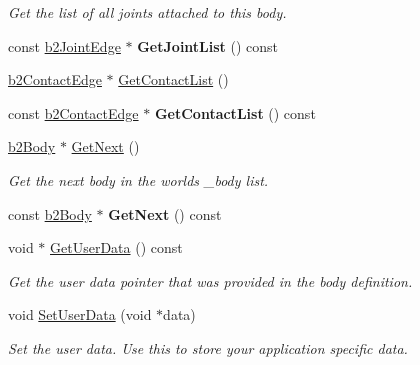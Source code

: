 \begin{DoxyCompactItemize}
\begin{DoxyCompactList}\small\item\em Get the list of all joints attached to this body. \end{DoxyCompactList}\item 
\mbox{\label{classb2Body_a3e581c94ae0fbc4e1083bf6ed8c0f0a9}} 
const \mbox{\hyperlink{structb2JointEdge}{b2\+Joint\+Edge}} $\ast$ {\bfseries Get\+Joint\+List} () const
\item 
\mbox{\hyperlink{structb2ContactEdge}{b2\+Contact\+Edge}} $\ast$ \mbox{\hyperlink{classb2Body_a16bdbfb266c82a0ef51be351a8928bc5}{Get\+Contact\+List}} ()
\item 
\mbox{\label{classb2Body_a137168690469fb838ab89c5f27a7cf43}} 
const \mbox{\hyperlink{structb2ContactEdge}{b2\+Contact\+Edge}} $\ast$ {\bfseries Get\+Contact\+List} () const
\item 
\mbox{\label{classb2Body_ad54182a11d02362b027a0eb072775bdc}} 
\mbox{\hyperlink{classb2Body}{b2\+Body}} $\ast$ \mbox{\hyperlink{classb2Body_ad54182a11d02362b027a0eb072775bdc}{Get\+Next}} ()
\begin{DoxyCompactList}\small\item\em Get the next body in the world\textquotesingle{}s _body list. \end{DoxyCompactList}\item
\mbox{\label{classb2Body_aa118d06e0ae6444c02bb5d22bb448269}} 
const \mbox{\hyperlink{classb2Body}{b2\+Body}} $\ast$ {\bfseries Get\+Next} () const
\item 
\mbox{\label{classb2Body_a672c782f7184faf3d673b08681dd63e3}} 
void $\ast$ \mbox{\hyperlink{classb2Body_a672c782f7184faf3d673b08681dd63e3}{Get\+User\+Data}} () const
\begin{DoxyCompactList}\small\item\em Get the user data pointer that was provided in the body definition. \end{DoxyCompactList}\item 
\mbox{\label{classb2Body_a5553a5ecdfd2d7200ba2405ce6043f52}} 
void \mbox{\hyperlink{classb2Body_a5553a5ecdfd2d7200ba2405ce6043f52}{Set\+User\+Data}} (void $\ast$data)
\begin{DoxyCompactList}\small\item\em Set the user data. Use this to store your application specific data. \end{DoxyCompactList}\item 

\end{DoxyCompactItemize}
